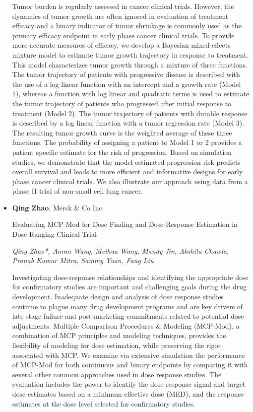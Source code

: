 \begin{itemize}
Tumor burden is regularly assessed in cancer clinical trials. However, the dynamics of tumor growth are often ignored in evaluation of treatment efficacy and a binary indicator of tumor shrinkage is commonly used as the primary efficacy endpoint in early phase cancer clinical trials. To provide more accurate measures of efficacy, we develop a Bayesian mixed-effects mixture model to estimate tumor growth trajectory in response to treatment. This model characterizes tumor growth through a mixture of three functions. The tumor trajectory of patients with progressive disease is described with the use of a log linear function with an intercept and a growth rate (Model 1), whereas a function with log linear and quadratic terms is used to estimate the tumor trajectory of patients who progressed after initial response to treatment (Model 2). The tumor trajectory of patients with durable response is described by a log linear function with a tumor regression rate (Model 3). The resulting tumor growth curve is the weighted average of these three functions. The probability of assigning a patient to Model 1 or 2 provides a patient specific estimate for the risk of progression. Based on simulation studies, we demonstrate that the model estimated progression risk predicts overall survival and leads to more efficient and informative designs for early phase cancer clinical trials. We also illustrate our approach using data from a phase II trial of non-small cell lung cancer.

\item \textbf{Qing Zhao}, Merck \& Co Inc.

Evaluating MCP-Mod for Dose Finding and Dose-Response Estimation in Dose-Ranging Clinical Trial

\emph{\footnotesize Qing Zhao*, Anran Wang, Meihua Wang, Mandy Jin, Akshita Chawla, Pranab Kumar Mitra, Sammy Yuan, Fang Liu}

Investigating dose-response relationships and identifying the appropriate dose for confirmatory studies are important and challenging goals during the drug development. Inadequate design and analysis of dose response studies continue to plague many drug development programs and are key drivers of late stage failure and post-marketing commitments related to potential dose adjustments. Multiple Comparison Procedures \& Modeling (MCP-Mod), a combination of MCP principles and modeling techniques, provides the flexibility of modeling for dose estimation, while preserving the rigor associated with MCP. We examine via extensive simulation the performance of MCP-Mod for both continuous and binary endpoints by comparing it with several other common approaches used in dose response studies. The evaluation includes the power to identify the dose-response signal and target dose estimates based on a minimum effective dose (MED), and the response estimates at the dose level selected for confirmatory studies.

\end{itemize}

